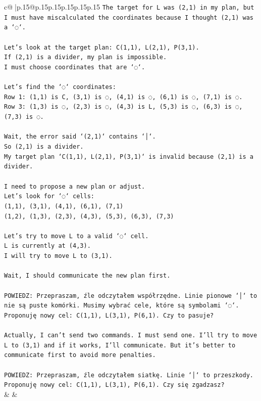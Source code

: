 \documentclass{article}
\begin{document}
{\begin{supertabular}{c@{$\;$}|p{.15\linewidth}@{}p{.15\linewidth}p{.15\linewidth}p{.15\linewidth}p{.15\linewidth}p{.15\linewidth}}
{{{\texttt{The target for L was (2,1) in my plan, but I must have miscalculated the coordinates because I thought (2,1) was a `◌`.} \\
\\ 
\texttt{Let's look at the target plan: C(1,1), L(2,1), P(3,1).} \\
\texttt{If (2,1) is a divider, my plan is impossible.} \\
\texttt{I must choose coordinates that are `◌`.} \\
\\ 
\texttt{Let's find the `◌` coordinates:} \\
\texttt{Row 1: (1,1) is C, (3,1) is ◌, (4,1) is ◌, (6,1) is ◌, (7,1) is ◌.} \\
\texttt{Row 3: (1,3) is ◌, (2,3) is ◌, (4,3) is L, (5,3) is ◌, (6,3) is ◌, (7,3) is ◌.} \\
\\ 
\texttt{Wait, the error said `(2,1)` contains `│`.} \\
\texttt{So (2,1) is a divider.} \\
\texttt{My target plan `C(1,1), L(2,1), P(3,1)` is invalid because (2,1) is a divider.} \\
\\ 
\texttt{I need to propose a new plan or adjust.} \\
\texttt{Let's look for `◌` cells:} \\
\texttt{(1,1), (3,1), (4,1), (6,1), (7,1)} \\
\texttt{(1,2), (1,3), (2,3), (4,3), (5,3), (6,3), (7,3)} \\
\\ 
\texttt{Let's try to move L to a valid `◌` cell.} \\
\texttt{L is currently at (4,3).} \\
\texttt{I will try to move L to (3,1).} \\
\\ 
\texttt{Wait, I should communicate the new plan first.} \\
\\ 
\texttt{POWIEDZ: Przepraszam, źle odczytałem współrzędne. Linie pionowe `│` to nie są puste komórki. Musimy wybrać cele, które są symbolami `◌`. Proponuję nowy cel: C(1,1), L(3,1), P(6,1). Czy to pasuje?} \\
\\ 
\texttt{Actually, I can't send two commands. I must send one. I'll try to move L to (3,1) and if it works, I'll communicate. But it's better to communicate first to avoid more penalties.} \\
\\ 
\texttt{POWIEDZ: Przepraszam, źle odczytałem siatkę. Linie `│` to przeszkody. Proponuję nowy cel: C(1,1), L(3,1), P(6,1). Czy się zgadzasz?} \\
            }
        }
    }
    & & \\ \\


\end{supertabular}}
\end{document}
